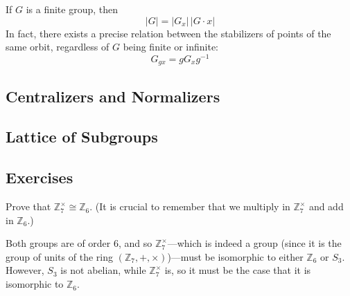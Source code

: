   \begin{corollary}
    \label{thm:orbit-stabilizer-theorem}
    If $G$ is a finite group, then 
    \begin{equation}
      |G| = |G_x| \, |G \cdot x|
    \end{equation}
    In fact, there exists a precise relation between the stabilizers of points of the same orbit, regardless of $G$ being finite or infinite: 
    \begin{equation}
      G_{g x} = g G_{x} g^{-1}
    \end{equation}
  \end{corollary}

\subsection{Centralizers and Normalizers} 

\subsection{Lattice of Subgroups} 

\subsection{Exercises}

  \begin{exercise}[Shifrin 6.2.2]
    Prove that $\mathbb{Z}_7^{\times} \cong \mathbb{Z}_6$. (It is crucial to remember that we multiply in $\mathbb{Z}_7^{\times}$ and add in $\mathbb{Z}_6$.)
  \end{exercise}
  \begin{solution}
    Both groups are of order 6, and so $\mathbb{Z}_7^\times$---which is indeed a group (since it is the group of units of the ring $(\mathbb{Z}_7, +, \times)$)---must be isomorphic to either $\mathbb{Z}_6$ or $S_3$. However, $S_3$ is not abelian, while $\mathbb{Z}^\times_7$ is, so it must be the case that it is isomorphic to $\mathbb{Z}_6$. 
  \end{solution}


